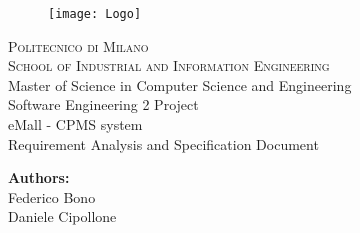 \begin{titlepage}
\begin{figure}[t]
\centering
\texttt{[image: Logo]}
\end{figure}
\begin{center}
    \textsc{ \LARGE{Politecnico di Milano \\}}
	\textsc{ \Large {School of Industrial and Information Engineering\\ }}
	\textnormal{ \Large{Master of Science in Computer Science and Engineering\\}}
	\vspace{3mm}
	\textnormal{ \Large{Software Engineering 2 Project\\}}
	\vspace{30mm}
	\fontsize{10mm}{7mm}\selectfont 
    \textup{eMall - CPMS system}\\
    \textnormal{ \LARGE{Requirement Analysis and Specification Document\\}}
\end{center}

\vspace{18mm}

\begin{center}
    \textnormal{\large{\bf Authors:\\}}
	{\large Federico Bono \\ Daniele Cipollone}
	\fontsize{10mm}{5mm}\selectfont 
\end{center}
\vspace{15mm}


\end{titlepage}
